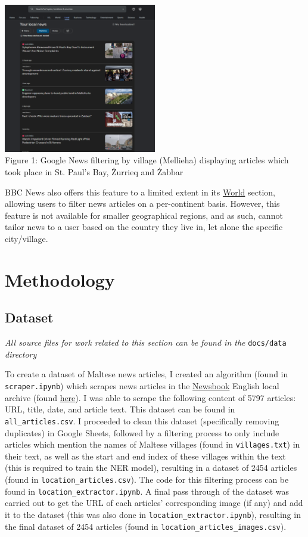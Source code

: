 \documentclass[a4paper, oneside, 11pt]{article}
\begin{document}
\begin{multicols*}{2}
  \begin{center}
    \includegraphics[width=0.5\textwidth]{./figures/googlenewsmellieha.png} \\
    Figure 1: Google News filtering by village (Mellieha) displaying articles which took place in St. Paul's Bay, Żurrieq and Żabbar
  \end{center}
  

  BBC News also offers this feature to a limited extent in its \href{https://www.bbc.com/news/world}{World} section, allowing users to filter news articles on a per-continent basis. However, this feature is not available for smaller geographical regions, and as such, cannot tailor news to a user based on the country they live in, let alone the specific city/village.

  
  \section{Methodology}
  \subsection{Dataset}
  \textit{All source files for work related to this section can be found in the} \verb|docs/data| \textit{directory}

  \medskip

  To create a dataset of Maltese news articles, I created an algorithm (found in \verb|scraper.ipynb|) which scrapes news articles in the \href{https://newsbook.com.mt/}{Newsbook} English local archive (found \href{https://newsbook.com.mt/en/category/news/local/}{here}). I was able to scrape the following content of 5797 articles: URL, title, date, and article text. This dataset can be found in \verb|all_articles.csv|. I proceeded to clean this dataset (specifically removing duplicates) in Google Sheets, followed by a filtering process to only include articles which mention the names of Maltese villages (found in \verb|villages.txt|) in their text, as well as the start and end index of these villages within the text (this is required to train the NER model), resulting in a dataset of 2454 articles (found in \verb|location_articles.csv|). The code for this filtering process can be found in \verb|location_extractor.ipynb|. A final pass through of the dataset was carried out to get the URL of each articles' corresponding image (if any) and add it to the dataset (this was also done in \verb|location_extractor.ipynb|), resulting in the final dataset of 2454 articles (found in \verb|location_articles_images.csv|).


\end{multicols*}
\end{document}
